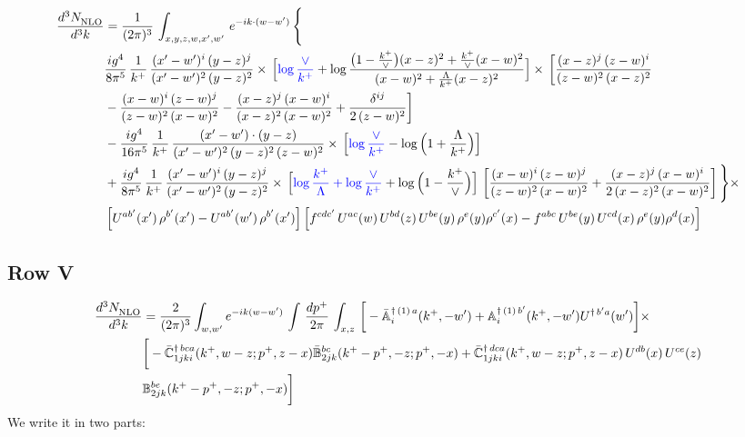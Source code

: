 \documentclass[9pt]{article}
\def\mf#1{\mathbb{#1}}
\numberwithin{equation}{section}
\begin{document}
\begin{align}
    \frac{d^{3}N_{\rm NLO}^{\rm}}{d^{3}k}  & =  \frac{1}{(2\pi)^{3}}\,
    \int_{x,y,z,w,x',w'}\,e^{-ik\cdot (w-w^\prime)}\,\Bigg\{\notag \\ & \frac{ig^{4}}{8\pi^{5}}\,\frac{1}{k^{+}}\,\frac{(x'-w')^{i}\,(y-z)^{j}}{(x'-w')^{2}\,(y-z)^{2}}\times\,\Big[{\color{blue}\log\frac{\vee}{k^{+}}}+\log\frac{\big(1-\frac{k^{+}}{\vee}\big)(x-z)^{2}+\frac{k^{+}}{\vee}(x-w)^{2}}{(x-w)^{2}+\frac{\Lambda}{k^{+}}(x-z)^{2}}\Big]\times\, \bigg[\frac{(x-z)^{j}\,(z-w)^{i}}{(z-w)^{2}\,(x-z)^{2}}\notag \\ & -\frac{(x-w)^{i}\,(z-w)^{j}}{(z-w)^{2}\,(x-w)^{2}}-\frac{(x-z)^{j}\,(x-w)^{i}}{(x-z)^{2}\,(x-w)^{2}}+\frac{\delta^{ij}}{2\,(z-w)^{2}}\bigg]\notag \\ & -\frac{ig^{4}}{16\pi^{5}}\,\frac{1}{k^{+}}\,\frac{(x'-w')\cdot (y-z)}{(x'-w')^{2}\,(y-z)^{2}\,(z-w)^{2}}\times\,\Big[{\color{blue}\log\frac{\vee}{k^{+}}}-\log\Big(1+\frac{\Lambda}{k^{+}}\Big)\Big]\notag \\ & + \frac{ig^{4}}{8\pi^{5}}\,\frac{1}{k^{+}}\,\frac{(x'-w')^{i}\,(y-z)^{j}}{(x'-w')^{2}\,(y-z)^{2}}\times\,\Big[{\color{blue}\log\frac{k^{+}}{\Lambda}+\log\frac{\vee}{k^{+}}}+\log\Big(1-\frac{k^{+}}{\vee}\Big)\Big]\,\left[\frac{(x-w)^{i}\,(z-w)^{j}}{(z-w)^{2}\,(x-w)^{2}}+\frac{(x-z)^{j}\,(x-w)^{i}}{2\, (x-z)^{2}\,(x-w)^{2}}\right] \Bigg\}\times\notag \\ &  \left[U^{ab'}(x')\,\rho^{b'}(x')-U^{ab'}(w')\,\rho^{b'}(x')\right] \left[f^{cdc'}\,U^{ac}(w)\,U^{bd}(z)\,U^{be}(y)\,\rho^{e}(y)\rho^{c'}(x)-f^{abc}\,U^{be}(y)\,U^{cd}(x)\,\rho^{e}(y)\rho^{d}(x)\right]
\end{align} 
\subsection{Row V\,}
\begin{align}
    \frac{d^{3}N_{\rm NLO}^{\rm}}{d^{3}k}  & = \frac{2}{(2\pi)^{3}}  \int_{w, w^\prime} e^{-ik(w-w^\prime)}\, \int\, \frac{dp^{+}}{2\pi}\,\int_{x,z}\, \bigg[-\bar{\mf{A}}^{\dagger\,(1)\,a}_{i}(k^{+},-w^{\prime})+\mf{A}^{\dagger\, (1)\, b^{\prime}}_{i}(k^{+},-w^{\prime})U^{\dagger\, b^{\prime}a}(w^{\prime})\bigg]\times\notag \\ & \bigg[-\Bar{\mf{C}}^{\dagger\, bca}_{1jki}(k^{+},w-z;p^{+},z-x)\Bar{\mf{B}}^{bc}_{2jk}(k^{+}-p^{+},- z;p^{+},-x)+\bar{\mf{C}}^{\dagger\, dca}_{1jki}(k^+,w-z; p^+, z-x)\,U^{db}(x)\,U^{ce}(z) \notag \\ & {\mf{B}}^{be}_{2jk} (k^{+}-p^+, -z; p^+, -x) \bigg]\nonumber
\end{align}
We write it in two parts:
\end{document}
